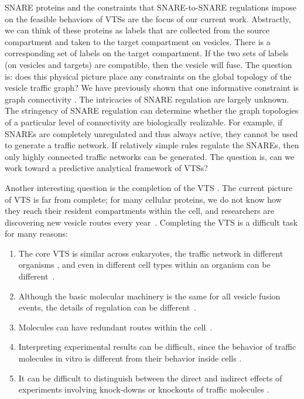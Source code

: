 SNARE proteins and the constraints that SNARE-to-SNARE regulations
impose on the feasible behaviors of VTSs are the focus of
our current work.
%
Abstractly, we can think of these proteins as labels that are
collected from the source compartment and taken to the target
compartment on vesicles.
%
There is a corresponding set of labels on the target compartment.
%
If the two sets of labels (on vesicles and targets) are compatible,
then the vesicle will fuse.
%
The question is: does this physical picture place any constraints on
the global topology of the vesicle traffic graph? We have previously shown that one informative constraint is graph connectivity \cite{shukla2017discovering}.
%
The intricacies of SNARE regulation are largely unknown.
%
The stringency of SNARE regulation can determine whether the graph
topologies of a particular level of connectivity are biologically
realizable.
%
For example, if SNAREs are completely unregulated and thus always
active, they cannot be used to generate a traffic network.
%
If relatively simple rules regulate the SNAREs, then only
highly connected traffic networks can be generated.
%
The question is, can we work toward a predictive analytical framework
of VTSs?

Another interesting question is the completion of the VTS \cite{synthesisGupta}. 
%
The current picture of VTS is far from complete; for many cellular proteins, we do not know how they reach their resident compartments within the cell, and
researchers are discovering new vesicle routes every
year~\cite{nickel2018unconventional,weill2018toolbox}. 
%
Completing the VTS is a difficult task for many reasons: 
\begin{enumerate}
	\item The core VTS is similar across eukaryotes, the traffic network in different organisms \cite{richardson2015evolutionary, barlow2017seeing}, and even in different cell types within an organism can be different~\cite{stoops2014trafficking,zhou2015arp2}.
	\item Although the basic molecular machinery is the same for all vesicle fusion events, the details of regulation can be different~\cite{davletov2007regulation,di2010calcium}.
	\item Molecules can have redundant routes within the cell~\cite{shimizu2014compensatory,nakatsukasa2014nutrient}.
	 \item Interpreting experimental results can be difficult, since the behavior of traffic molecules in vitro is different from their behavior inside cells \cite{furukawa2014multiple}.
	\item It can be difficult to distinguish between the direct and indirect effects of experiments involving knock-downs or knockouts of traffic molecules \cite{hirst2004epsinr,mishev2013small}.
   
\end{enumerate}

